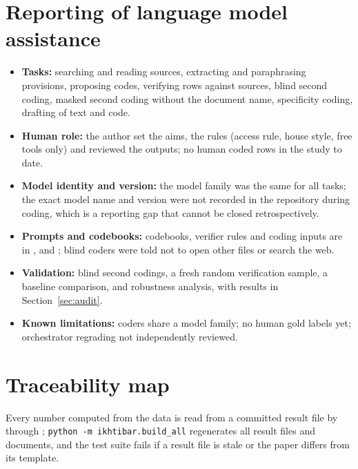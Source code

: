 \documentclass[conference]{IEEEtran}
\begin{document}
\section{Reporting of language model assistance}\label{app:llm}
\begin{itemize}
\item \textbf{Tasks:} searching and reading sources, extracting and paraphrasing provisions, proposing codes, verifying rows against sources, blind second coding, masked second coding without the document name, specificity coding, drafting of text and code.
\item \textbf{Human role:} the author set the aims, the rules (access rule, house style, free tools only) and reviewed the outputs; no human coded rows in the study to date.
\item \textbf{Model identity and version:} the model family was the same for all tasks; the exact model name and version were not recorded in the repository during coding, which is a reporting gap that cannot be closed retrospectively.
\item \textbf{Prompts and codebooks:} codebooks, verifier rules and coding inputs are in ,  and ; blind coders were told not to open other files or search the web.
\item \textbf{Validation:} blind second codings, a fresh random verification sample, a baseline comparison, and robustness analysis, with results in Section~\ref{sec:audit}.
\item \textbf{Known limitations:} coders share a model family; no human gold labels yet; orchestrator regrading not independently reviewed.
\end{itemize}

\section{Traceability map}\label{app:trace}
Every number computed from the data is read from a committed result file by  through ; \texttt{python -m ikhtibar.build\_all} regenerates all result files and documents, and the test suite fails if a result file is stale or the paper differs from its template.
\end{document}
